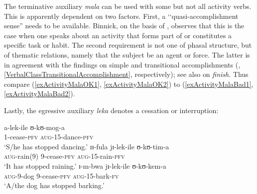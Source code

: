 \label{QuasiAccomplishment} The terminative auxiliary \textit{mala} can be used with some but not all activity verbs. This is apparently dependent on two factors. First, a \lq\lq quasi-accomplishment sense'' \citep[176]{BinnickR1991} needs to be available. Binnick, on the basis of \citet[61]{DowtyD1979}, observes that this is the case when one speaks about an activity that forms part of or constitutes a specific task or habit. The second requirement is not one of phasal structure, but of thematic relations, namely that the subject be an agent or force. The latter is in agreement with the findings on simple and transitional accomplishments (, \ref{VerbalClassTransitionalAccomplishment}, respectively); see also \citet[135]{FreedA1979} on  \textit{finish}. Thus compare (\ref{exActivityMalaOK1}, \ref{exActivityMalaOK2}) to (\ref{exActivityMalaBad1}, \ref{exActivityMalaBad2}).
\begin{exe}
\ex\begin{xlist}
\end{xlist}
\end{exe}

Lastly, the egressive auxiliary \textit{leka} denotes a cessation or interruption:
\begin{exe}
\ex
\begin{xlist}
\ex \gll a-lek-ile ʊ-kʊ-mog-a\\
1-cease-\textsc{pfv} \textsc{aug}-15-dance-\textsc{pfv}\\
\glt \lq S/he has stopped dancing.'
\ex \gll ɪɪ-fula jɪ-lek-ile ʊ-kʊ-tim-a\\
\textsc{aug}-rain(9) 9-cease-\textsc{pfv} \textsc{aug}-15-rain-\textsc{pfv}\\
\glt \lq It has stopped raining.'
\ex \gll ɪ-m-bwa jɪ-lek-ile ʊ-kʊ-kem-a\\
\textsc{aug}-9-dog 9-cease-\textsc{pfv} \textsc{aug}-15-bark-\textsc{fv}\\
\glt \lq A/the dog has stopped barking.'
\end{xlist}
\end{exe}

